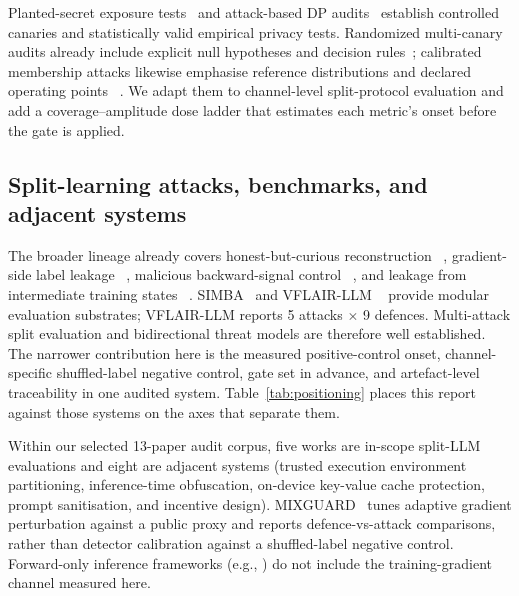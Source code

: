 \documentclass[11pt]{article}
\begin{document}
Planted-secret exposure tests~\cite{carlini2019secret} and attack-based DP
audits~\cite{jagielski2020auditing,nasr2023tight,steinke2023onerun} establish
controlled canaries and statistically valid empirical privacy tests.
Randomized multi-canary audits already include explicit null hypotheses and
decision rules~\cite{pillutla2023randomization}; calibrated membership attacks
likewise emphasise reference distributions and declared operating points
~\cite{carlini2022lira}. We adapt
them to channel-level split-protocol evaluation and add a coverage--amplitude
dose ladder that estimates each metric's onset before the gate is applied.

\subsection{Split-learning attacks, benchmarks, and adjacent systems}

The broader lineage already covers honest-but-curious reconstruction
~\cite{erdogan2022unsplit}, gradient-side label leakage
~\cite{li2022labelleakage}, malicious backward-signal control
~\cite{pasquini2021tiger}, and leakage from intermediate training states
~\cite{gao2023pcat}. SIMBA~\cite{singh2024simba} and VFLAIR-LLM
~\cite{vflairllm} provide modular evaluation substrates; VFLAIR-LLM reports
5 attacks $\times$ 9 defences. Multi-attack split evaluation and bidirectional threat models are therefore
well established. The narrower
contribution here is the measured positive-control onset, channel-specific
shuffled-label negative control, gate set in advance, and artefact-level traceability
in one audited system. Table~\ref{tab:positioning} places this report against
those systems on the axes that separate them.

Within our selected 13-paper audit corpus, five works are in-scope split-LLM
evaluations and eight are adjacent systems (trusted execution environment
partitioning, inference-time obfuscation, on-device key-value cache protection,
prompt sanitisation, and incentive design). MIXGUARD~\cite{mixguard} tunes adaptive
gradient perturbation against
a public proxy and reports defence-vs-attack comparisons, rather than detector
calibration against a shuffled-label negative control. Forward-only inference frameworks
(e.g., \cite{luoprompt,aloepri,gelo}) do not include the training-gradient
channel measured here.
\end{document}
